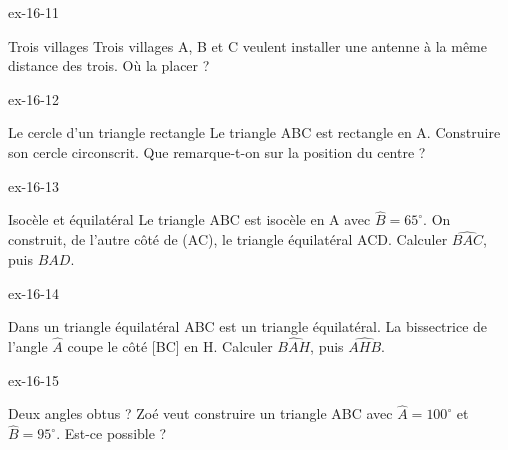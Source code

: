 \begin{blocLivre}{ex-16-11}\begin{exercice}[3]{Trois villages}
Trois villages A, B et C veulent installer une antenne à la même distance des trois. Où la placer ?
\label{fig-ex-16-11}
\end{exercice}\end{blocLivre}
\begin{blocLivre}{ex-16-12}\begin{exercice}[3]{Le cercle d’un triangle rectangle}
Le triangle ABC est rectangle en A. Construire son cercle circonscrit. Que remarque-t-on sur la position du centre ?
\label{fig-ex-16-12}
\end{exercice}\end{blocLivre}
\begin{blocLivre}{ex-16-13}\begin{exercice}[3]{Isocèle et équilatéral}
Le triangle ABC est isocèle en A avec $\widehat{B}=65^\circ$. On construit, de l’autre côté de (AC), le triangle équilatéral ACD. Calculer $\widehat{BAC}$, puis $\widehat{BAD}$.
\label{fig-ex-16-13}
\end{exercice}\end{blocLivre}
\begin{blocLivre}{ex-16-14}\begin{exercice}[3]{Dans un triangle équilatéral}
ABC est un triangle équilatéral. La bissectrice de l’angle $\widehat{A}$ coupe le côté [BC] en H. Calculer $\widehat{BAH}$, puis $\widehat{AHB}$.
\label{fig-ex-16-14}
\end{exercice}\end{blocLivre}
\begin{blocLivre}{ex-16-15}\begin{exercice}[3]{Deux angles obtus ?}
Zoé veut construire un triangle ABC avec $\widehat{A}=100^\circ$ et $\widehat{B}=95^\circ$. Est-ce possible ?
\label{fig-ex-16-15}
\end{exercice}\end{blocLivre}

\clearpage
